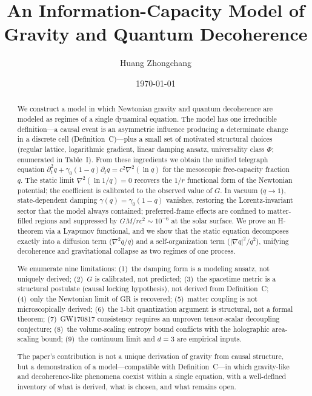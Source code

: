 \documentclass[aps,prd,twocolumn,showpacs,superscriptaddress,preprintnumbers]{revtex4-2}
\begin{document}
\title{An Information-Capacity Model of Gravity and Quantum Decoherence}

\author{Huang Zhongchang}

\date{\today}

\begin{abstract}
We construct a model in which Newtonian gravity and quantum decoherence are modeled as regimes of a single dynamical equation. The model has one irreducible definition---a causal event is an asymmetric influence producing a determinate change in a discrete cell (Definition~C)---plus a small set of motivated structural choices (regular lattice, logarithmic gradient, linear damping ansatz, universality class $\Phi$; enumerated in Table~I). From these ingredients we obtain the unified telegraph equation $\partial_t^2 q + \gamma_0(1-q)\partial_t q = c^2\nabla^2(\ln q)$ for the mesoscopic free-capacity fraction $q$. The static limit $\nabla^2(\ln 1/q)=0$ recovers the $1/r$ functional form of the Newtonian potential; the coefficient is calibrated to the observed value of $G$. In vacuum ($q\to1$), state-dependent damping $\gamma(q)=\gamma_0(1-q)$ vanishes, restoring the Lorentz-invariant sector that the model always contained; preferred-frame effects are confined to matter-filled regions and suppressed by $GM/rc^2\sim10^{-6}$ at the solar surface. We prove an H-theorem via a Lyapunov functional, and we show that the static equation decomposes exactly into a diffusion term ($\nabla^2 q/q$) and a self-organization term ($|\nabla q|^2/q^2$), unifying decoherence and gravitational collapse as two regimes of one process.

We enumerate nine limitations: (1)~the damping form is a modeling ansatz, not uniquely derived; (2)~$G$ is calibrated, not predicted; (3)~the spacetime metric is a structural postulate (causal locking hypothesis), not derived from Definition~C; (4)~only the Newtonian limit of GR is recovered; (5)~matter coupling is not microscopically derived; (6)~the 1-bit quantization argument is structural, not a formal theorem; (7)~GW170817 consistency requires an unproven tensor-scalar decoupling conjecture; (8)~the volume-scaling entropy bound conflicts with the holographic area-scaling bound; (9)~the continuum limit and $d=3$ are empirical inputs.

The paper's contribution is not a unique derivation of gravity from causal structure, but a demonstration of a model---compatible with Definition~C---in which gravity-like and decoherence-like phenomena coexist within a single equation, with a well-defined inventory of what is derived, what is chosen, and what remains open.
\end{abstract}
\end{document}
